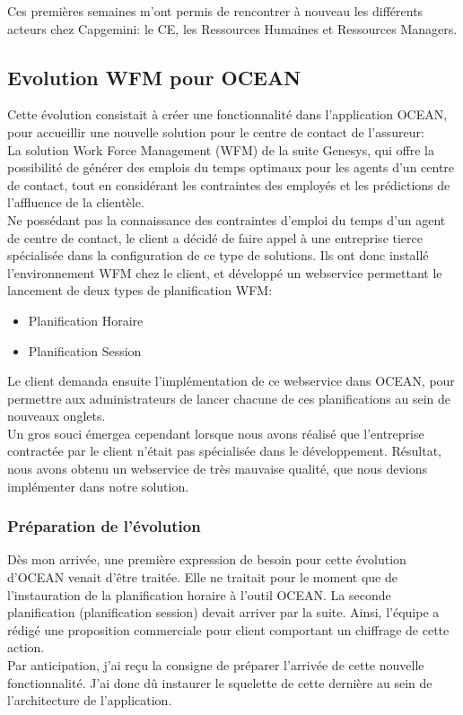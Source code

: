 \documentclass{rapport}
\begin{document}
Ces premières semaines m'ont permis de rencontrer à nouveau les différents acteurs chez Capgemini: le CE, les Ressources Humaines et Ressources Managers.\\ 

\newpage
\subsection{Evolution WFM pour OCEAN}

Cette évolution consistait à créer une fonctionnalité dans l'application OCEAN, pour accueillir une nouvelle solution pour le centre de contact de l'assureur: \\
La solution Work Force Management (WFM) de la suite Genesys, qui offre la possibilité de générer des emplois du temps optimaux pour les agents d'un centre de contact, tout en considérant les contraintes des employés et les prédictions de l'affluence de la clientèle.\\

Ne possédant pas la connaissance des contraintes d'emploi du temps d'un agent de centre de contact, le client a décidé de faire appel à une entreprise tierce spécialisée dans la configuration de ce type de solutions. Ils ont donc installé l'environnement WFM chez le client, et développé un webservice permettant le lancement de deux types de planification WFM:
\begin{itemize}
  \item Planification Horaire
  \item Planification Session
\end{itemize}

Le client demanda ensuite l'implémentation de ce webservice dans OCEAN, pour permettre aux administrateurs de lancer chacune de ces planifications au sein de nouveaux onglets.\\

Un gros souci émergea cependant lorsque nous avons réalisé que l'entreprise contractée par le client n'était pas spécialisée dans le développement. Résultat, nous avons obtenu un webservice de très mauvaise qualité, que nous devions implémenter dans notre solution.

\subsubsection{Préparation de l'évolution}

Dès mon arrivée, une première expression de besoin pour cette évolution d'OCEAN venait d'être traitée. Elle ne traitait pour le moment que de l'instauration de la planification horaire à l'outil OCEAN. La seconde planification (planification session) devait arriver par la suite. Ainsi, l'équipe a rédigé une proposition commerciale pour client comportant un chiffrage de cette action.\\
Par anticipation, j'ai reçu la consigne de préparer l'arrivée de cette nouvelle fonctionnalité. J'ai donc dû instaurer le squelette de cette dernière au sein de l'architecture de l'application.\\
\end{document}
